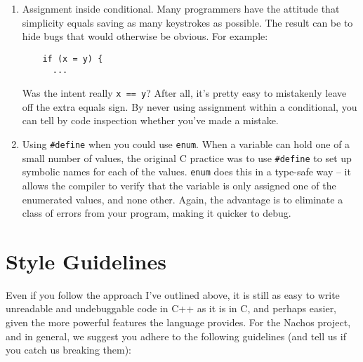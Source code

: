 \begin{enumerate}
\item Assignment inside conditional.  Many programmers have the attitude
that simplicity equals saving as many keystrokes as possible.
The result can be to hide bugs that would otherwise be obvious.
For example:

\begin{verbatim}
    if (x = y) {
      ...
\end{verbatim}

Was the intent really {\tt x == y}?  After all, it's pretty easy
to mistakenly leave off the extra equals sign.  By never using
assignment within a conditional, you can tell by code inspection
whether you've made a mistake.

\item Using {\tt \#define} when you could use {\tt enum}.
When a variable can hold one of a small number of values,
the original C practice was to use {\tt \#define} to set up 
symbolic names for each of the values.  {\tt enum} does this 
in a type-safe way -- it allows the compiler to verify
that the variable is only assigned one of the enumerated values,
and none other.  Again, the advantage is to eliminate a class of
errors from your program, making it quicker to debug.
\end{enumerate}
\newpage

\section{Style Guidelines}

Even if you follow the approach I've outlined above, it is still
as easy to write unreadable and undebuggable code in C++ as it
is in C, and perhaps easier, given the more powerful features the
language provides.  For the Nachos project, and in general, we suggest 
you adhere to the following guidelines (and tell us if you catch us 
breaking them):

